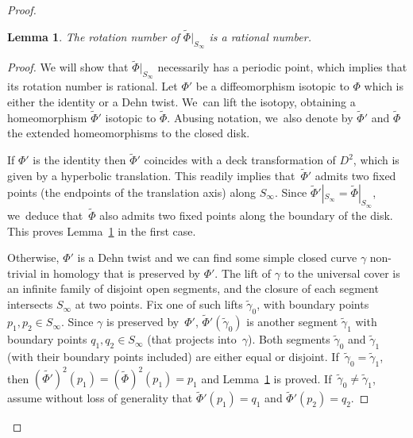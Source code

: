 \documentclass[11pt]{article}
\newtheorem{lemma}[theorem]{Lemma}
\theoremstyle{definition}
\begin{document}
\begin{proof}
\begin{lemma}\label{lemma: rational}
The rotation number of $\widetilde{\Phi}|_{S_\infty}$ is a rational number.
\end{lemma}

\begin{proof}
We will show that $\widetilde{\Phi}|_{S_\infty}$ necessarily has a periodic point, which implies that its rotation number is rational. Let $\Phi'$ be a diffeomorphism isotopic to $\Phi$ which is either the identity or a Dehn twist. We~can lift the isotopy, obtaining a homeomorphism $\widetilde \Phi'$ isotopic to $\widetilde \Phi$. Abusing notation, we~also denote by $\widetilde \Phi'$ and $\widetilde \Phi$ the extended homeomorphisms to the closed disk.

If $\Phi'$ is the identity then $\widetilde \Phi'$ coincides with a deck transformation of $D^2$, which is given by a hyperbolic translation. This readily implies that~$\widetilde \Phi'$ admits two fixed points (the endpoints of the translation axis) along $S_\infty$. Since $\widetilde \Phi'|_{S_\infty}=\widetilde \Phi|_{S_\infty}$, we~deduce that~$\widetilde \Phi$ also admits two fixed points along the boundary of the disk. This proves Lemma~\ref{lemma: rational} in the first case.

Otherwise, $\Phi'$ is a Dehn twist and we can find some simple closed curve $\gamma$ non-trivial in homology that is preserved by $\Phi'$. The lift of $\gamma$ to the universal cover is an infinite family of disjoint open segments, and the closure of each segment intersects $S_\infty$ at two points. Fix one of such lifts $\widetilde \gamma_0$, with boundary points $p_1,p_2 \in S_\infty$. Since $\gamma$ is preserved by~$\Phi'$, $\widetilde \Phi'(\widetilde \gamma_0)$ is another segment $\widetilde \gamma_1$ with boundary points $q_1, q_2 \in S_\infty$ (that projects into~$\gamma$). Both segments $\widetilde \gamma_0$ and $\widetilde \gamma_1$ (with their boundary points included) are either equal or disjoint. If~$\widetilde{\gamma}_0=\widetilde{\gamma}_1$, then $(\widetilde{\Phi'})^2(p_1)=(\widetilde{\Phi})^2(p_1)=p_1$ and Lemma~\ref{lemma: rational} is proved. If~$\widetilde{\gamma}_0\neq \widetilde{\gamma}_1$, assume without loss of generality that $\widetilde \Phi'(p_1)=q_1$ and $\widetilde \Phi'(p_2)=q_2$.


\end{proof}
\end{proof}
\end{document}
